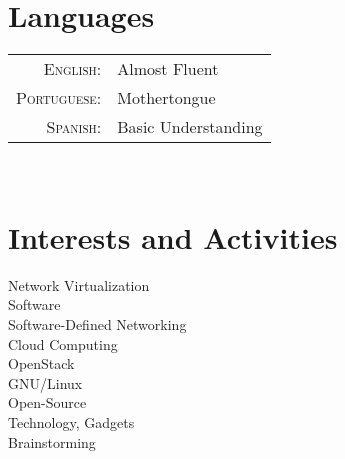 \documentclass[a4paper,10pt]{article} %
\begin{document}

\section{Languages}

\begin{tabular}{rl}
	\textsc{English:} & Almost Fluent\\
	
	\textsc{Portuguese:} & Mothertongue\\
	
	\textsc{Spanish:} & Basic Understanding\\
\end{tabular} \\


\section{Interests and Activities}
Network Virtualization\\
Software\\
Software-Defined Networking\\
Cloud Computing\\
OpenStack\\
GNU/Linux\\
Open-Source\\
Technology, Gadgets\\
Brainstorming\\

%
\end{document}
